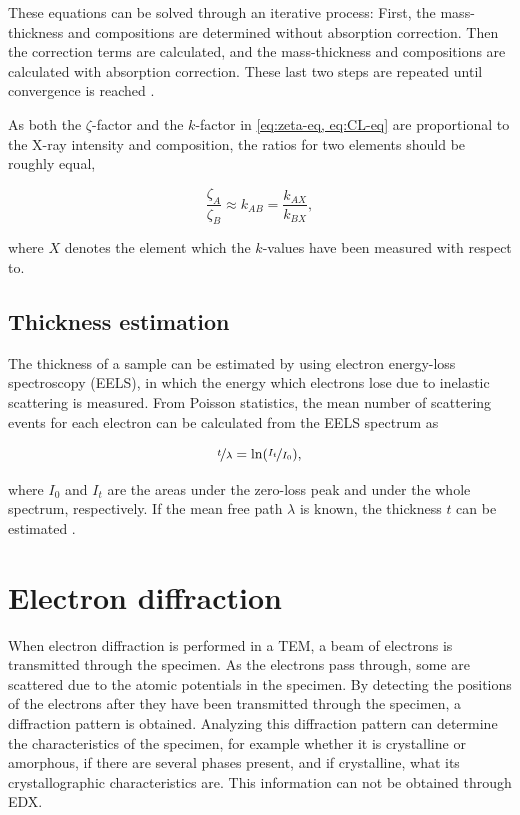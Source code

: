 These equations can be solved through an iterative process: First, the mass-thickness and compositions are determined without absorption correction. Then the correction terms are calculated, and the mass-thickness and compositions are calculated with absorption correction. These last two steps are repeated until convergence is reached \cite{zeta-method}.

As both the $\zeta$-factor and the $k$-factor in \cref{eq:zeta-eq, eq:CL-eq} are proportional to the X-ray intensity and composition, the ratios for two elements should be roughly equal,

\begin{equation}
\label{compare_zeta_CL}
\frac{\zeta_A}{\zeta_B} \approx k_{AB} = \frac{k_{AX}}{k_{BX}},
\end{equation}

where $X$ denotes the element which the $k$-values have been measured with respect to.

	\subsection{Thickness estimation}
	\label{sec:theory/thickness-est}
The thickness of a sample can be estimated by using electron energy-loss spectroscopy (EELS), in which the energy which electrons lose due to inelastic scattering is measured. From Poisson statistics, the mean number of scattering events for each electron can be calculated from the EELS spectrum as 

\begin{equation}
\label{eq:logratio}
\nicefrac{t}{\lambda}=\ln (\nicefrac{I_t}{I_0}),
\end{equation}

where $I_0$ and $I_t$ are the areas under the zero-loss peak and under the whole spectrum, respectively. If the mean free path $\lambda$ is known, the thickness $t$ can be estimated \cite{eels-bok,logratio-article}.

\section{Electron diffraction}\label{ED}
When electron diffraction is performed in a TEM, a beam of electrons is transmitted through the specimen. As the electrons pass through, some are scattered due to the atomic potentials in the specimen. By detecting the positions of the electrons after they have been transmitted through the specimen, a diffraction pattern is obtained. Analyzing this diffraction pattern can determine the characteristics of the specimen, for example whether it is crystalline or amorphous, if there are several phases present, and if crystalline, what its crystallographic characteristics are. This information can not be obtained through EDX.

